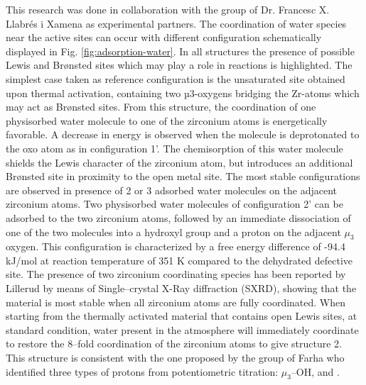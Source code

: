 This research was done in collaboration with the group of Dr. Francesc X. Llabr\'es i Xamena as experimental partners. The coordination of water species near the active sites can occur with different configuration schematically displayed in Fig. \ref{fig:adsorption-water}. 
In all structures the presence of possible Lewis and Brønsted sites which may play a role in reactions is highlighted. The simplest case taken as reference configuration is the unsaturated site obtained upon thermal activation, containing two µ3-oxygens bridging the Zr-atoms which may act as Br\o{}nsted sites. From this structure, the coordination of one physisorbed water molecule to one of the zirconium atoms is energetically favorable. A decrease in energy is observed when the molecule is deprotonated to the oxo atom as in configuration 1’. The chemisorption of this water molecule shields the Lewis character of the zirconium atom, but introduces an additional Br\o{}nsted site in proximity to the open metal site. The most stable configurations are observed in presence of 2 or 3 adsorbed water molecules on the adjacent zirconium atoms. Two physisorbed water molecules of configuration 2’ can be adsorbed to the two zirconium atoms, followed by an immediate dissociation of one of the two molecules into a hydroxyl group and a proton on the adjacent $\mu_3$ oxygen. This configuration is characterized by a free energy difference of -94.4 kJ/mol at reaction temperature of 351 K compared to the dehydrated defective site. The presence of two zirconium coordinating species has been reported by Lillerud \cite{oien2014detailed} by means of Single--crystal X-Ray diffraction (SXRD), showing that the material is most stable when all zirconium atoms are fully coordinated. When starting from the thermally activated material that contains open Lewis sites, at standard condition, water present in the atmosphere will immediately coordinate to restore the 8--fold coordination of the zirconium atoms to give structure 2. This structure is consistent with the one proposed by the group of Farha \cite{klet2016evaluation} who identified three types of protons from potentiometric titration:  $\mu_3$--OH,  and . 
